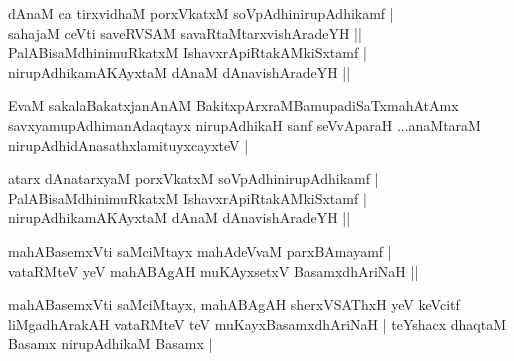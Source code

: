 \begin{entry}
\medskip
\begin{shl}
dAnaM ca tirxvidhaM porxVkatxM soVpAdhinirupAdhikamf |\\[1pt]
sahajaM ceVti saveRVSAM savaRtaMtarxvishAradeYH ||\\[1pt]
PalABisaMdhinimuRkatxM IshavxrApiRtakAMkiSxtamf |\\[1pt]
nirupAdhikamAKAyxtaM dAnaM dAnavishAradeYH ||
\end{shl}
\medskip
{}
\end{entry}

\begin{entry}
\medskip
\begin{shl}
EvaM sakalaBakatxjanAnAM BakitxpArxraMBamupadiSaTxmahAtAmx savxyamupAdhimanAdaqtayx
nirupAdhikaH sanf seVvAparaH
...anaMtaraM nirupAdhidAnasathxlamituyxcayxteV |
\end{shl}
\medskip
{}
\medskip
\begin{shl}
atarx dAnatarxyaM porxVkatxM soVpAdhinirupAdhikamf |\\[1pt]
PalABisaMdhinimuRkatxM IshavxrApiRtakAMkiSxtamf |\\[1pt]
nirupAdhikamAKAyxtaM dAnaM dAnavishAradeYH ||
\end{shl}
\medskip
{}
\end{entry}

\begin{entry}
\medskip
\begin{shl}
mahABasemxVti saMciMtayx mahAdeVvaM parxBAmayamf |\\[1pt]
vataRMteV yeV mahABAgAH muKAyxsetxV BasamxdhAriNaH ||
\end{shl}
\medskip
{}
\medskip
\begin{shl}
mahABasemxVti saMciMtayx, mahABAgAH sherxVSAThxH yeV keVcitf liMgadhArakAH
vataRMteV teV muKayxBasamxdhAriNaH |
teYshacx dhaqtaM Basamx nirupAdhikaM Basamx |
\end{shl}
\medskip
{}
\end{entry}

